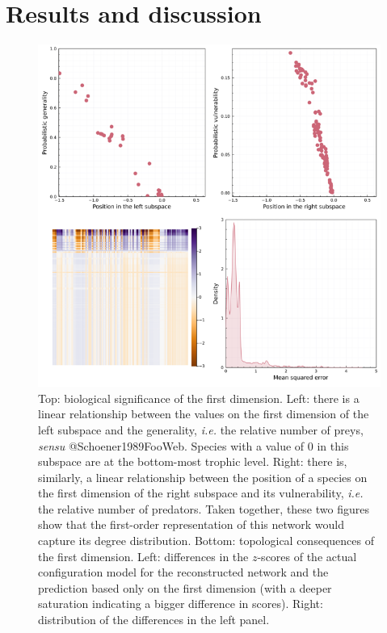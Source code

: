 \section{Results and discussion}\label{results-and-discussion}

\begin{figure}[h]
    \centering
    \includegraphics[width=\textwidth]{figures/figure-degree.png}
    \caption{Top: biological significance of the first dimension. Left:
there is a linear relationship between the values on the first dimension
of the left subspace and the generality, \emph{i.e.} the relative number
of preys, \emph{sensu} @Schoener1989FooWeb. Species with a value of 0 in
this subspace are at the bottom-most trophic level. Right: there is,
similarly, a linear relationship between the position of a species on
the first dimension of the right subspace and its vulnerability,
\emph{i.e.} the relative number of predators. Taken together, these two
figures show that the first-order representation of this network would
capture its degree distribution. Bottom: topological consequences of the
first dimension. Left: differences in the \(z\)-scores of the actual
configuration model for the reconstructed network and the prediction
based only on the first dimension (with a deeper saturation indicating a
bigger difference in scores). Right: distribution of the differences in
the left panel.}
    \label{fig:degree}
\end{figure}

